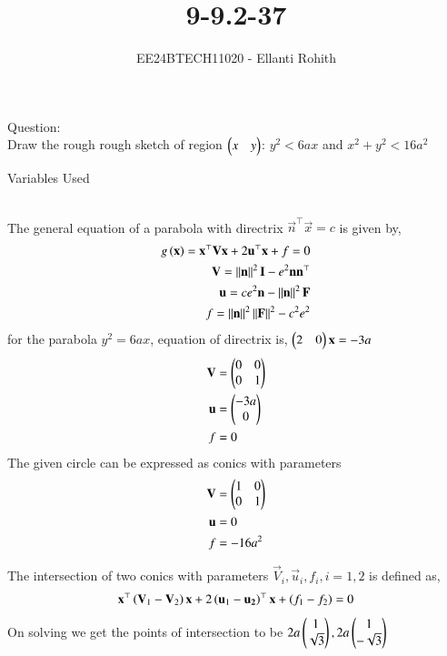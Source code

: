 \documentclass[journal]{IEEEtran}
\begin{document}

\vspace{3cm}

\title{9-9.2-37}
\author{EE24BTECH11020 - Ellanti Rohith}
{\let\newpage\relax\maketitle}
Question:\\
Draw the rough rough sketch of region $\begin{pmatrix}x&y\end{pmatrix}$: $y^2<6ax$ and $x^2+y^2<16a^2$ 
\begin{table}[h!]    
  \centering
  
  \caption{Variables Used}
  \label{tab1-9.2.1}
\end{table}\\
\solution
The general equation of a parabola with directrix $\vec{n}^{\top}\vec{x}=c$ is given by,
\begin{align}
	g\left(\mathbf{x}\right)=\mathbf{x}^{\top}\mathbf{V}\mathbf{x}+2\mathbf{u}^{\top}\mathbf{x}+f=0\\
	\mathbf{V}=\left\lVert\mathbf{n}\right\rVert^2\mathbf{I}-e^2\mathbf{n}\mathbf{n}^{\top}\\
	\mathbf{u}=ce^2\mathbf{n}-\left\lVert\mathbf{n}\right\rVert^2\mathbf{F}\\
	f=\left\lVert\mathbf{n}\right\rVert^2\left\lVert\mathbf{F}\right\rVert^2-c^2e^2
\end{align}
for the parabola $y^2=6ax$, equation of directrix is, $\begin{pmatrix}2&0\end{pmatrix}\mathbf{x}=-3a$
\begin{align}
	\mathbf{V}&=\begin{pmatrix}0&0\\0&1\end{pmatrix}\\
	\mathbf{u}&=\begin{pmatrix}-3a\\0\end{pmatrix}\\
	f&=0
\end{align}
The given circle can be expressed as conics with parameters
\begin{align}
	\mathbf{V}&=\begin{pmatrix}1&0\\0&1\end{pmatrix}\\
	\mathbf{u}&=0\\
	f&=-16a^2
\end{align}

The intersection of two conics with parameters $\vec{V}_i,\vec{u}_i,f_i, i=1,2$ is defined as,
\begin{align}
	\mathbf{x}^{\top}\left(\mathbf{V}_1-\mathbf{V}_2\right)\mathbf{x}+2\left(\mathbf{u}_1-\mathbf{u_2}\right)^{\top}\mathbf{x}+\left(f_1-f_2\right)=0
\end{align} 
On solving we get the points of intersection to be $2a\begin{pmatrix}1\\ \sqrt{3}\end{pmatrix},2a\begin{pmatrix}1\\-\sqrt{3}\end{pmatrix}$
\end{document}

